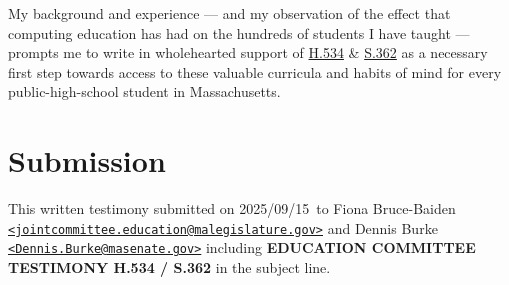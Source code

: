 \documentclass[12pt]{article}%
\def\docdate{2025/09/15}
\begin{document}
My background and experience --- and my observation of the effect that computing education has had on the hundreds of students I have taught --- prompts me to write in wholehearted support of \href{https://malegislature.gov/Bills/194/H534}{H.534} \& \href{https://malegislature.gov/Bills/194/S362}{S.362} as a necessary first step towards access to these valuable curricula and habits of mind for every public-high-school student in Massachusetts.

\section{Submission}
\label{Submission}

This written testimony submitted on \docdate\ to Fiona Bruce-Baiden \texttt{\href{mailto:jointcommittee.education@malegislature.gov}{<jointcommittee.education\allowbreak @malegislature.gov>}} and Dennis Burke \texttt{\href{mailto:Dennis.Burke\allowbreak @masenate.gov}{<Dennis.Burke@masenate.gov>}} including \textbf{EDUCATION COMMITTEE TESTIMONY H.534 / S.362} in the subject line.

\printbibliography %


\end{document}
